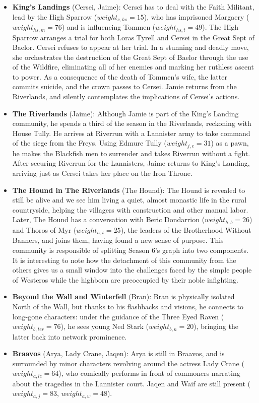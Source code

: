 \documentclass[10pt,twocolumn,letterpaper]{article}
\begin{document}
\begin{itemize}
    \item \textbf{King's Landings} (Cersei, Jaime): Cersei has to deal with the Faith Militant, lead by the High Sparrow ($weight_{c,hs}=15$), who has imprisoned Margaery ($weight_{hs,m}=76$) and is influencing Tommen ($weight_{hs,t}=49$). The High Sparrow arranges a trial for both Loras Tyrell and Cersei in the Great Sept of Baelor. Cersei refuses to appear at her trial. In a stunning and deadly move, she orchestrates the destruction of the Great Sept of Baelor through the use of the Wildfire, eliminating all of her enemies and marking her ruthless ascent to power. As a consequence of the death of Tommen's wife, the latter commits suicide, and the crown passes to Cersei. Jamie returns from the Riverlands, and silently contemplates the implications of Cersei's actions.
    \item \textbf{The Riverlands} (Jaime): Although Jamie is part of the King's Landing community, he spends a third of the season in the Riverlands, reckoning with House Tully. He arrives at Riverrun with a Lannister army to take command of the siege from the Freys. Using Edmure Tully ($weight_{j,e}=31$) as a pawn, he makes the Blackfish men to surrender and takes Riverrun without a fight. After securing Riverrun for the Lannisters, Jaime returns to King's Landing, arriving just as Cersei takes her place on the Iron Throne.
    \item \textbf{The Hound in The Riverlands} (The Hound): The Hound is revealed to still be alive and we see him living a quiet, almost monastic life in the rural countryside, helping the villagers with construction and other manual labor. Later, The Hound has a conversation with Beric Dondarrion ($weight_{h,b}=26$) and Thoros of Myr ($weight_{h,t}=25$), the leaders of the Brotherhood Without Banners, and joins them, having found a new sense of purpose. This community is responsible of splitting Season 6's graph into two components. It is interesting to note how the detachment of this community from the others gives us a small window into the challenges faced by the simple people of Westeros while the highborn are preoccupied by their noble infighting.
    \item \textbf{Beyond the Wall and Winterfell} (Bran): Bran is physically isolated North of the Wall, but thanks to his flashbacks and visions, he connects to long-gone characters: under the guidance of the Three Eyed Raven ($weight_{b,ter}=76$), he sees young Ned Stark ($weight_{b,n}=20$), bringing the latter back into network prominence. 
    \item \textbf{Braavos} (Arya, Lady Crane, Jaqen): Arya is still in Braavos, and is surrounded by minor characters revolving around the actress Lady Crane ($weight_{a,lc}=64$), who comically performs in front of commoners narrating about the tragedies in the Lannister court. Jaqen and Waif are still present ($weight_{a,j}=83$, $weight_{a,w}=48$).

\end{itemize}
\end{document}
